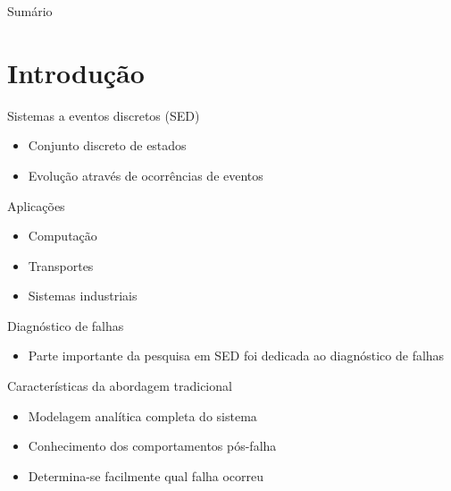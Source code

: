 \documentclass[xcolor=x11names,compress,framenumber]{beamer}
\renewcommand{\(}{\begin{columns}}
\renewcommand{\)}{\end{columns}}
\newcommand{\<}[1]{\begin{column}{#1}}
\renewcommand{\>}{\end{column}}
\begin{document}



\begin{frame}{Sumário}
\tableofcontents
\end{frame}





\section{Introdução}


\begin{frame}{Sistemas a eventos discretos (SED)}
\begin{block}{}
	\begin{itemize}
		\item Conjunto discreto de estados
		\item Evolução através de ocorrências de eventos
	\end{itemize}
\end{block}
\begin{block}{Aplicações}
	\begin{itemize}
		\item Computação
		\item Transportes
		\item Sistemas industriais
	\end{itemize}
\end{block}
\end{frame}

\begin{frame}{Diagnóstico de falhas}
\begin{block}{}
\begin{itemize}
\item Parte importante da pesquisa em SED foi dedicada ao diagnóstico de falhas
\end{itemize}
\end{block}
\begin{block}{Características da abordagem tradicional}
\begin{itemize}
	\item Modelagem analítica completa do sistema
	\item Conhecimento dos comportamentos pós-falha
	\item Determina-se facilmente qual falha ocorreu
\end{itemize}
\end{block}
\end{frame}
\end{document}
